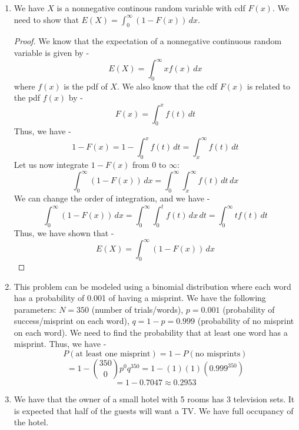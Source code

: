 \begin{enumerate}
    We note that the signs are bernoulli random variables with parameter $p = \frac{1}{2}$ since there are equal chances of getting a $+$ or $-$ sign. We have -
    $$P(X = 1) = P(+)P(-)P(+) + P(-)P(+)P(-) = \frac{1}{2} \cdot \frac{1}{2} \cdot \frac{1}{2} + \frac{1}{2} \cdot \frac{1}{2} \cdot \frac{1}{2} = \frac{1}{4}$$
    $$P(X = 0) = 1 - P(X = 1) = 1 - \frac{1}{4} = \frac{3}{4}$$
    We need the variance and expectation of $X$. We have -
    \[\boxed{
    E(X) = \sum x \cdot P(X=x) = 0 \cdot \frac{3}{4} + 1 \cdot \frac{1}{4} = \frac{1}{4}}
    \]
    \[\boxed{V(X) = E(X^2) - (E(X))^2 = \left(0^2 \cdot \frac{3}{4} + 1^2 \cdot \frac{1}{4}\right) - \left(\frac{1}{4}\right)^2 = \frac{1}{4} - \frac{1}{16} = \frac{3}{16}
    }\]
    \item We have $X$ is a nonnegative continous random variable with cdf $F(x)$. We need to show that $E(X) = \int_{0}^{\infty} (1- F(x)) \, dx$. 
    \begin{proof}
    We know that the expectation of a nonnegative continuous random variable is given by -
    \[E(X) = \int_{0}^{\infty} x f(x) \, dx\]
    where $f(x)$ is the pdf of $X$. We also know that the cdf $F(x)$ is related to the pdf $f(x)$ by -
    \[F(x) = \int_{0}^{x} f(t) \, dt\]
    Thus, we have -
    \[1 - F(x) = 1 - \int_{0}^{x} f(t) \, dt = \int_{x}^{\infty} f(t) \, dt\]
    Let us now integrate $1 - F(x)$ from 0 to $\infty$:
    \[\int_{0}^{\infty} (1 - F(x)) \, dx = \int_{0}^{\infty} \int_{x}^{\infty} f(t) \, dt \, dx\]
    We can change the order of integration, and we have - 
    \[\int_{0}^{\infty} (1 - F(x)) \, dx = \int_{0}^{\infty} \int_{0}^{t} f(t) \, dx \, dt = \int_{0}^{\infty} t f(t) \, dt\]
    Thus, we have shown that -
    \[E(X) = \int_{0}^{\infty} (1 - F(x)) \, dx\]
    \end{proof}
    \item This problem can be modeled using a binomial distribution where each word has a probability of 0.001 of having a misprint. We have the following parameters:
    $N = 350$ (number of trials/words),
    $p = 0.001$ (probability of success/misprint on each word),
    $q = 1 - p = 0.999$ (probability of no misprint on each word).
    We need to find the probability that at least one word has a misprint. Thus, we have -
    \[P(\text{at least one misprint}) = 1 - P(\text{no misprints})\]
    \[= 1 - \binom{350}{0} p^0 q^{350} = 1 - (1)(1)(0.999^{350})\]
    \[\boxed{= 1 - 0.7047 \approx 0.2953
    }\]
    \item We have that the owner of a small hotel with 5 rooms has 3 television sets. It is expected that half of the guests will want a TV. We have full occupancy of the hotel. 

\end{enumerate}
